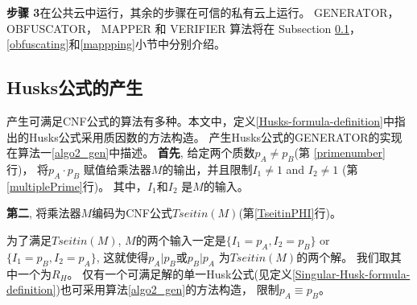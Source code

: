 \textbf{步骤 3}在公共云中运行，其余的步骤在可信的私有云上运行。
%
GENERATOR， OBFUSCATOR， MAPPER 和 VERIFIER 算法将在 Subsection \ref{genhusk}， \ref{obfuscating}和\ref{mappping}小节中分别介绍。
\subsection{Husks公式的产生}\label{genhusk}

%

产生可满足CNF公式的算法有多种\cite{microgenSAT,genSAT}。本文中，定义\ref{Husks-formula-definition}中指出的Husks公式采用质因数的方法构造\cite{genSAT}。
产生Husks公式的GENERATOR的实现在算法一\ref{algo2_gen}中描述。
%
%
\textbf{首先},
给定两个质数$p_A \neq p_B$(第 \ref{primenumber}行)，
将$p_A \cdot p_B$ 赋值给乘法器$M$的输出，并且限制$I_1\ne 1$ and  $I_2\ne 1$ (第\ref{multiplePrime}行)。
其中，$I_1$和$I_2$ 是$M$的输入。

\textbf{第二},
将乘法器$M$编码为CNF公式$Tseitin(M)$(第\ref{TseitinPHI}行)。

为了满足$Tseitin(M)$, $M$的两个输入一定是$\{I_1=p_A,I_2=p_B\}$ or $\{I_1=p_B,I_2=p_A\}$,
这就使得$p_A|p_B$或$p_B|p_A$ 为$Tseitin(M)$的两个解。
我们取其中一个为$R_H$。
%
仅有一个可满足解的单一Husk公式(见定义\ref{Singular-Husk-formula-definition})也可采用算法\ref{algo2_gen}的方法构造，
限制$p_A\equiv p_B$。


